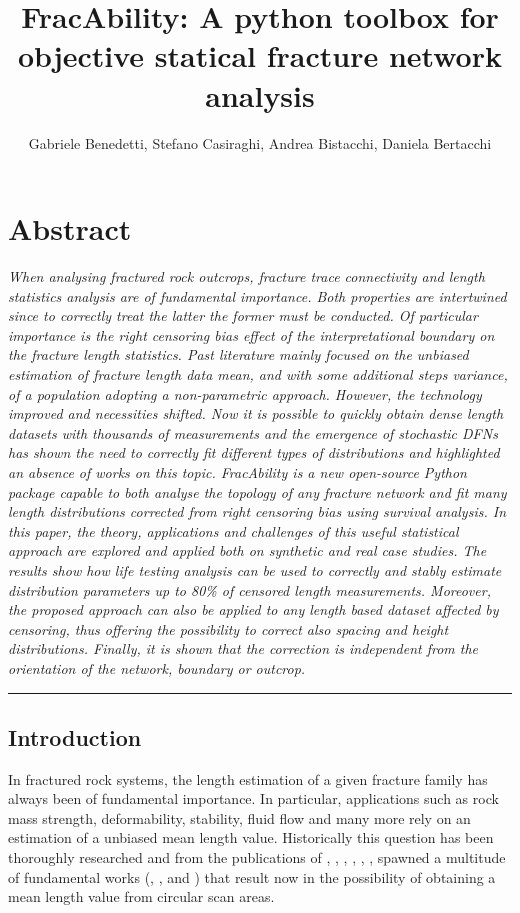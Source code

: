 \documentclass[11pt]{article}
\title{FracAbility: A python toolbox for objective statical fracture network analysis}
\author{Gabriele Benedetti, Stefano Casiraghi, Andrea Bistacchi, Daniela Bertacchi}
\date{}
\begin{document}
	\maketitle
	\section*{Abstract}
	\textit{When analysing fractured rock outcrops, fracture trace connectivity and length statistics analysis are of fundamental importance. Both properties are intertwined since to correctly treat the latter the former must be conducted. Of particular importance is the right censoring bias effect of the interpretational boundary on the fracture length statistics. Past literature mainly focused on the unbiased estimation of fracture length data mean, and with some additional steps variance, of a population adopting a non-parametric approach. However, the technology improved and necessities shifted. Now it is possible to quickly obtain dense length datasets with thousands of measurements and the emergence of stochastic DFNs has shown the need to correctly fit different types of distributions and highlighted an absence of works on this topic. 
	FracAbility is a new open-source Python package capable to both analyse the topology of any fracture network and fit many length distributions corrected from right censoring bias using survival analysis. In this paper, the theory, applications and challenges of this useful statistical approach are explored and applied both on synthetic and real case studies. The results show how life testing analysis can be used to correctly and stably estimate distribution parameters up to 80\% of censored length measurements. Moreover, the proposed approach can also be applied to any length based dataset affected by censoring, thus offering the possibility to correct also spacing and height distributions. Finally, it is shown that the correction is independent from the orientation of the network, boundary or outcrop.}
	\rule{\textwidth}{0.1mm}
	\begin{multicols}{2}
			\section{Introduction}
				In fractured rock systems, the length estimation of a given fracture family has always been of fundamental importance. In particular, applications such as rock mass strength, deformability, stability, fluid flow and many more rely on an estimation of a unbiased mean length value. Historically this question has been thoroughly researched and from the publications of \cite{terzaghiSourcesErrorJoint1965}, \cite{cowanHomogeneousLinesegmentProcesses1979}, \cite{warburtonStereologicalInterpretationJoint1980}, \cite{pahlEstimatingMeanLength1981}, \cite{laslettCensoringEdgeEffects1982}, \cite{kulatilakeEstimationMeanTrace1984}, spawned a multitude of fundamental works (\cite{mauldonEstimatingMeanFracture1998}, \cite{zhangEstimatingMeanTrace1998}, \cite{mauldonCircularScanlinesCircular2001} and \cite{rohrbaughEstimatingFractureTrace2002}) that result now in the possibility of obtaining a mean length value from circular scan areas.
	
	\newpage
	\printbibliography
	\end{multicols}
	
\end{document}
